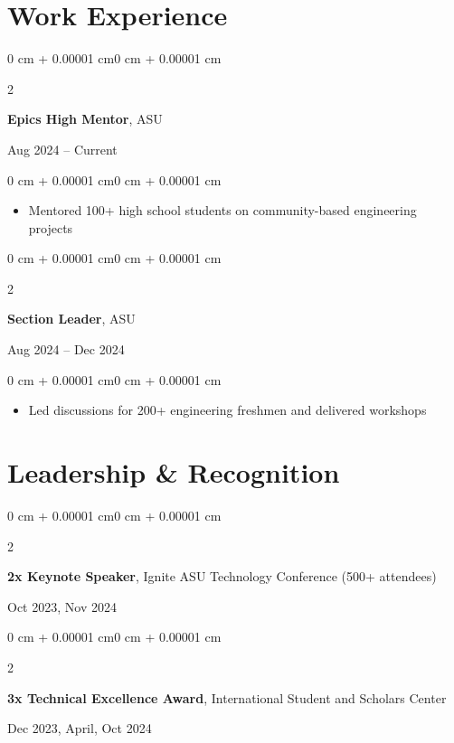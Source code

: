 \documentclass[10pt]{article}
\newenvironment{highlights}{
    \begin{itemize}[
        topsep=0.10 cm,
        parsep=0.10 cm,
        partopsep=0pt,
        itemsep=0pt,
        leftmargin=0 cm + 10pt
    ]
}{
    \end{itemize}
}
\newenvironment{onecolentry}{
    \begin{adjustwidth}{0 cm + 0.00001 cm}{0 cm + 0.00001 cm}
}{
    \end{adjustwidth}
}
\newenvironment{twocolentry}[2][]{
    \onecolentry
    \def\secondColumn{#2}
    \setcolumnwidth{\fill, 4.5 cm}
    \begin{paracol}{2}
}{
    \switchcolumn \raggedleft \secondColumn
    \end{paracol}
    \endonecolentry
}
\begin{document}
    \section{Work Experience}

    \vspace{0.15cm}
    
    \begin{twocolentry}{Aug 2024 -- Current}
        \textbf{Epics High Mentor}, ASU
    \end{twocolentry}
    
    \begin{onecolentry}
        \begin{highlights}
            \item Mentored 100+ high school students on community-based engineering projects
        \end{highlights}
    \end{onecolentry}
    
    \vspace{0.15cm}
    
    \begin{twocolentry}{Aug 2024 -- Dec 2024}
        \textbf{Section Leader}, ASU
    \end{twocolentry}
    
    \begin{onecolentry}
        \begin{highlights}
            \item Led discussions for 200+ engineering freshmen and delivered workshops
        \end{highlights}
    \end{onecolentry}

    \section{Leadership \& Recognition}
    
    \vspace{0.05cm}
    
    \begin{twocolentry}{Oct 2023, Nov 2024}
        \textbf{2x Keynote Speaker}, Ignite ASU Technology Conference (500+ attendees)
    \end{twocolentry}
    
    \begin{twocolentry}{Dec 2023, April, Oct 2024}
        \textbf{3x Technical Excellence Award}, International Student and Scholars Center
    \end{twocolentry}
\end{document}
